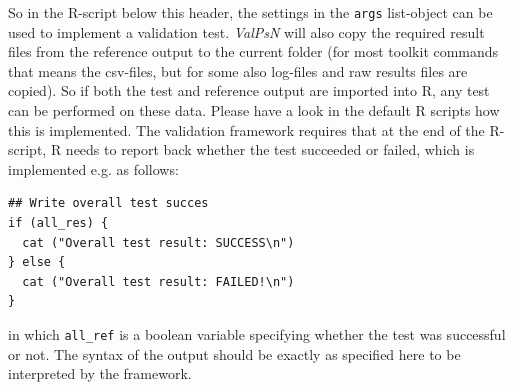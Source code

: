\documentclass[a4,11pt]{report} \usepackage[pdftex]{graphicx}
\newcommand{\ValPsN}{\textcolor{PiranaOrange}{\textit{ValPsN}}\xspace}
\begin{document}
\noindent So in the R-script below this header, the settings in the
{\tt args} list-object can be used to implement a validation
test. \ValPsN will also copy the required result files from the
reference output to the current folder (for most toolkit commands
that means the csv-files, but for some also log-files and raw results
files are copied). So if both the test and reference output are
imported into R, any test can be performed on these data. Please have
a look in the default R scripts how this is implemented. The
validation framework requires that at the end of the R-script, R needs
to report back whether the test succeeded or failed, which is
implemented e.g. as follows:

\begin{lstlisting}
## Write overall test succes
if (all_res) {
  cat ("Overall test result: SUCCESS\n")
} else {
  cat ("Overall test result: FAILED!\n")
}
\end{lstlisting}

\noindent in which {\tt all\_ref} is a boolean variable specifying whether the
test was successful or not. The syntax of the output should be
exactly as specified here to be interpreted by the framework.
\end{document}

